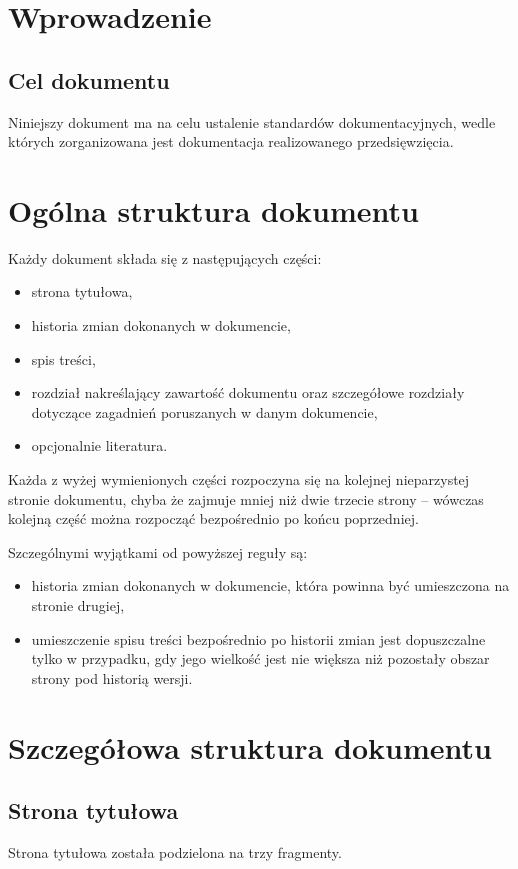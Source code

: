 \documentclass 	[11pt, a4paper, leqno]	{article}					%
\newcommand{\newoddside}{								%
	\ifthenelse{ \NOT \isodd{\thepage} } {
	    \newpage
	} {
	    \newpage
	    \newpage
	}
}
\begin{document}
\tableofcontents

\newoddside

\section{Wprowadzenie}

\subsection{Cel dokumentu}
\noindent
Niniejszy dokument ma na celu ustalenie standardów dokumentacyjnych, wedle których zorganizowana jest dokumentacja realizowanego przedsięwzięcia.
\section{Ogólna struktura dokumentu}
\noindent
Każdy dokument składa się z następujących części:
\begin{itemize}
	\item strona tytułowa,
	\item historia zmian dokonanych w dokumencie,
	\item spis treści,
	\item rozdział nakreślający zawartość dokumentu oraz szczegółowe rozdziały dotyczące zagadnień poruszanych w danym dokumencie,
	\item opcjonalnie literatura.
\end{itemize}

Każda z wyżej wymienionych części rozpoczyna się na kolejnej nieparzystej stronie dokumentu, chyba że zajmuje mniej niż dwie trzecie strony -- wówczas kolejną część można rozpocząć bezpośrednio po końcu poprzedniej. 

Szczególnymi wyjątkami od powyższej reguły są:

\begin{itemize}
	\item historia zmian dokonanych w dokumencie, która powinna być umieszczona na stronie drugiej,
	\item umieszczenie spisu treści bezpośrednio po historii zmian jest dopuszczalne tylko w przypadku, gdy jego wielkość jest nie większa niż pozostały obszar strony pod historią wersji.
\end{itemize}

\section{Szczegółowa struktura dokumentu}
\subsection{Strona tytułowa}
\noindent
Strona tytułowa została podzielona na trzy fragmenty.
\end{document}
